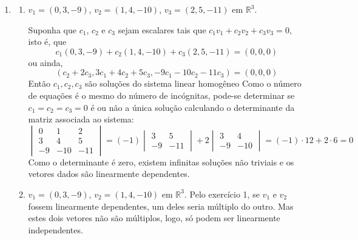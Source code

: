 \documentclass[12pt,a4paper]{article}
\newcommand*\R{\mathbb{R}}
\begin{document}
\begin{enumerate}
\item 
\begin{enumerate}
\item $v_1=(0,3,-9)$, $v_2=(1,4,-10)$, $v_3=(2,5,-11)$ em $\R^3$.

Suponha que $c_1$, $c_2$ e $c_3$ sejam escalares tais que $c_1v_1 + c_2v_2 + c_3v_3 = 0$, isto é, que
\[
c_1(0,3,-9) + c_2(1,4,-10) + c_3 (2,5,-11)
= (0, 0, 0)
\]
ou ainda,
\[(c_2 + 2c_3, 3c_1 + 4c_2 + 5c_3, -9c_1 - 10c_2 - 11c_3)
= (0, 0, 0)
\]
Então $c_1, c_2, c_3$ são soluções do sistema linear homogêneo
Como o número de equações é o mesmo do número de incógnitas, pode-se determinar se $c_1=c_2=c_3=0$ é ou não a única solução calculando o determinante da matriz associada ao sistema:
\[
\begin{vmatrix}
 0 &   1 &   2 \\
 3 &   4 &   5 \\
-9 & -10 & -11
\end{vmatrix}
=
(-1)
\begin{vmatrix}
 3 &   5 \\
-9 & -11
\end{vmatrix}
+2
\begin{vmatrix}
 3 &   4 \\
-9 & -10
\end{vmatrix}
= 
(-1) \cdot 12
+2 \cdot 6
= 0
\]
Como o determinante é zero, existem infinitas soluções não triviais e os vetores dados  são linearmente dependentes.




\item $v_1=(0,3,-9)$, $v_2=(1,4,-10)$ em $\R^3$.
Pelo exercício 1, se $v_1$ e $v_2$ fossem linearmente dependentes, um deles seria múltiplo do outro. Mas estes dois vetores não são múltiplos, logo, só podem ser linearmente independentes.



\end{enumerate}
\end{enumerate}
\end{document}

